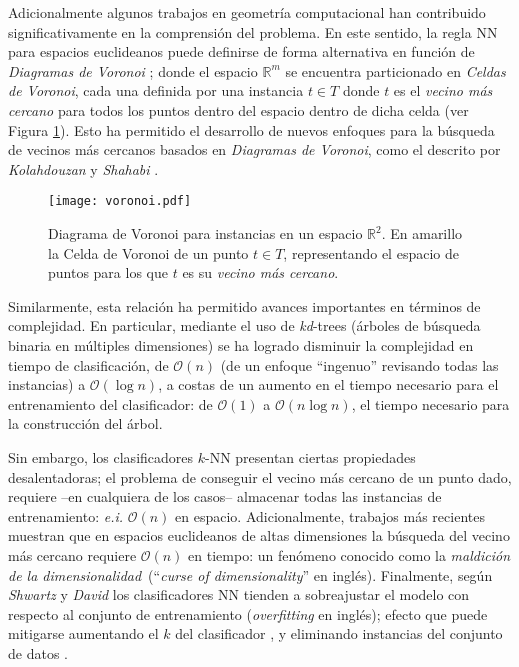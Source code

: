 Adicionalmente algunos trabajos en geometría computacional han contribuido significativamente en la comprensión del problema. En este sentido, la regla NN para espacios euclideanos puede definirse de forma alternativa en función de \emph{Diagramas de Voronoi} \cite{voronoi1908nouvelles}; donde el espacio $\mathbb{R}^m$ se encuentra particionado en \emph{Celdas de Voronoi}, cada una definida por una instancia $t \in T$ donde $t$ es el \emph{vecino más cercano} para todos los puntos dentro del espacio dentro de dicha celda (ver Figura \ref{voronoi}). Esto ha permitido el desarrollo de nuevos enfoques para la búsqueda de vecinos más cercanos basados en \emph{Diagramas de Voronoi}, como el descrito por \emph{Kolahdouzan} y \emph{Shahabi} \cite{Kolahdouzan:2004:VKN:1316689.1316762}.

\begin{figure}[h!]
\centering
\texttt{[image: voronoi.pdf]}
\caption[Diagramas de Voronoi y NN]{Diagrama de Voronoi para instancias en un espacio $\mathbb{R}^2$. En amarillo la Celda de Voronoi de un punto $t \in T$, representando el espacio de puntos para los que $t$ es su \emph{vecino más cercano}.}
\label{voronoi}
\end{figure}

Similarmente, esta relación ha permitido avances importantes en términos de complejidad. En particular, mediante el uso de \emph{kd}-trees \cite{Bentley:1975:MBS:361002.361007} (árboles de búsqueda binaria en múltiples dimensiones) se ha logrado disminuir la complejidad en tiempo de clasificación, de $\mathcal{O}(n)$ (de un enfoque ``ingenuo'' revisando todas las instancias) a $\mathcal{O}(\log{n})$, a costas de un aumento en el tiempo necesario para el entrenamiento del clasificador: de $\mathcal{O}(1)$ a $\mathcal{O}(n\log{n})$, el tiempo necesario para la construcción del árbol.

Sin embargo, los clasificadores $k$-NN presentan ciertas propiedades desalentadoras; el problema de conseguir el vecino más cercano de un punto dado, requiere --en cualquiera de los casos-- almacenar todas las instancias de entrenamiento: \emph{e.i.} $\mathcal{O}(n)$ en espacio. Adicionalmente, trabajos más recientes \cite{DBLP:conf/soda/KrauthgamerL04} muestran que en espacios euclideanos de altas dimensiones la búsqueda del vecino más cercano requiere $\mathcal{O}(n)$ en tiempo: un fenómeno conocido como la \guillemotleft\emph{maldición de la dimensionalidad}\guillemotright\ (``\emph{curse of dimensionality}'' en inglés). Finalmente, según \emph{Shwartz} y \emph{David} \cite{shalev2014understanding} los clasificadores NN tienden a sobreajustar el modelo con respecto al conjunto de entrenamiento (\emph{overfitting} en inglés); efecto que puede mitigarse aumentando el $k$ del clasificador \cite{devroye1994strong, shalev2014understanding}, y eliminando instancias del conjunto de datos \cite{DBLP:journals/corr/GottliebKK13}.

